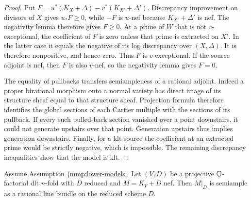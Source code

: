 \begin{proof}
Put \(F=u^*(K_X+\Delta)-v^*(K_{X'}+\Delta')\).
Discrepancy improvement on divisors of \(X\) gives \(u_*F\geq 0\),
while \(-F\) is \(u\)-nef because \(K_{X'}+\Delta'\) is nef.
The negativity lemma therefore gives \(F\geq 0\).
At a prime of \(W\) that is not \(v\)-exceptional, the coefficient
of \(F\) is zero unless that prime is extracted on \(X'\).
In the latter case it equals the negative of its log discrepancy
over \((X,\Delta)\). It is therefore nonpositive, and hence zero.
Thus \(F\) is \(v\)-exceptional. If the source adjoint is nef,
then \(F\) is also \(v\)-nef, so the negativity lemma gives \(F=0\).

The equality of pullbacks transfers semiampleness of a rational
adjoint. Indeed a proper birational morphism onto a normal variety
has direct image of its structure sheaf equal to that structure
sheaf. Projection formula therefore identifies the global sections
of each Cartier multiple with the sections of its pullback.
If every such pulled-back section vanished over a point downstairs,
it could not generate upstairs over that point. Generation upstairs
thus implies generation downstairs.
Finally, for a klt source the coefficient at an extracted prime
would be strictly negative, which is impossible. The remaining
discrepancy inequalities show that the model is klt.
\end{proof}

\begin{proposition}
\label{prop:boundary-restriction}
Assume Assumption~\ref{mmp:lower-models}. Let \((V,D)\) be a
projective \(\mathbb{Q}\)-factorial dlt \(n\)-fold with \(D\) reduced and
\(M=K_V+D\) nef. Then \(M|_D\) is semiample as a rational line
bundle on the reduced scheme \(D\).
\end{proposition}

